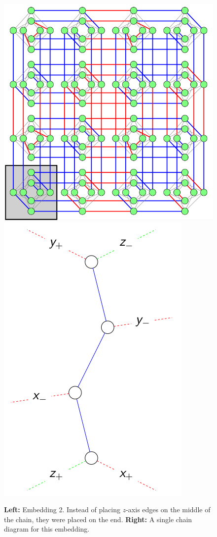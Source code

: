 \documentclass[11pt]{report}
\newcommand{\?}{\stackrel{?}{=}}
\begin{document}
\begin{figure}[h!]
  \centerline{\includegraphics[width=\linewidth/3]{resources/images/emb2.png}\hspace{1cm}\includegraphics[height=\linewidth/3]{resources/images/emb2_chain.png}}
  \caption{\textbf{Left:} Embedding 2. Instead of placing $z$-axis edges on the middle of the chain, they were placed on the end. \textbf{Right:} A single chain diagram for this embedding.}
  \label{fig:boat1}
\end{figure}
\end{document}
